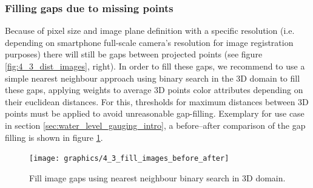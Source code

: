 \documentclass[review]{elsarticle}
\begin{document}
\subsubsection{Filling gaps due to missing points}
Because of pixel size and image plane definition with a specific resolution (i.e. depending on smartphone full-scale camera's resolution for image registration purposes) there will still be gaps between projected points (see figure \ref{fig:4_3_dist_images}, right). In order to fill these gaps, we recommend to use a simple nearest neighbour approach using binary search \cite{Bentley1975} in the 3D domain to fill these gaps, applying weights to average 3D points color attributes depending on their euclidean distances. For this, thresholds for maximum distances between 3D points must be applied to avoid unreasonable gap-filling. Exemplary for use case in section \ref{sec:water_level_gauging_intro}, a before--after comparison of the gap filling is shown in figure \ref{fig:4_3_fill_images_before_after}. %

\begin{figure}[h]
\centering
\texttt{[image: graphics/4\_3\_fill\_images\_before\_after]}
\caption{Fill image gaps using nearest neighbour binary search in 3D domain.}
\label{fig:4_3_fill_images_before_after}
\end{figure}

%

\end{document}
